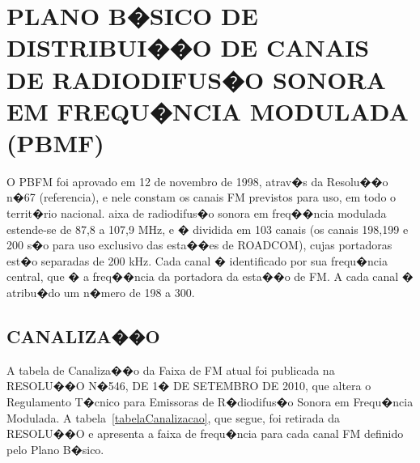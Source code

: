 \chapter{PLANO B�SICO DE DISTRIBUI��O DE CANAIS DE RADIODIFUS�O SONORA EM FREQU�NCIA MODULADA (PBMF)}

O PBFM foi aprovado em 12 de novembro de 1998, atrav�s da Resolu��o n�67 (referencia), e nele constam os canais FM previstos para uso,
 em todo o territ�rio nacional.
 aixa de radiodifus�o sonora em freq��ncia modulada estende-se de 87,8 a 107,9 MHz, e � 
dividida em 103 canais (os canais 198,199 e 200 s�o para uso exclusivo das esta��es de ROADCOM), cujas portadoras est�o separadas de 200 kHz.
 Cada canal � identificado por sua frequ�ncia central,
 que � a freq��ncia da portadora da esta��o de FM. A cada canal � atribu�do um n�mero de 198 a 300.

\section{CANALIZA��O}

A tabela de Canaliza��o da Faixa de FM atual foi publicada na RESOLU��O N�546, DE 1� DE SETEMBRO DE 2010, que altera o Regulamento T�cnico para Emissoras de R�diodifus�o 
Sonora em Frequ�ncia
Modulada. A tabela~\ref{tabelaCanalizacao}, que segue, foi retirada da RESOLU��O e apresenta a faixa de frequ�ncia para cada canal FM definido pelo Plano B�sico. 

